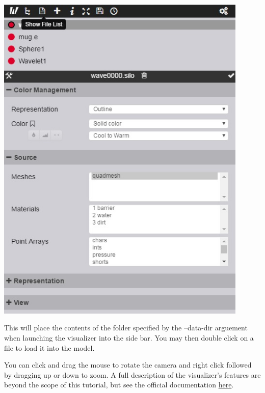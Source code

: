 \begin{center}
\includegraphics[width=12cm]{images/ParaViewVisualizer}
\end{center}

This will place the contents of the folder specified by the --data-dir arguement
when launching the visualizer into the side bar. You may then double click on a
file to load it into the model. 

You can click and drag the mouse to rotate the camera and right click followed
by dragging up or down to zoom. A full description of the visualizer's features
are beyond the scope of this tutorial, but see the official documentation
\href{http://www.paraview.org/ParaView3/Doc/Nightly/www/js-doc/index.html#!/guide/web_visualizer}{here}.